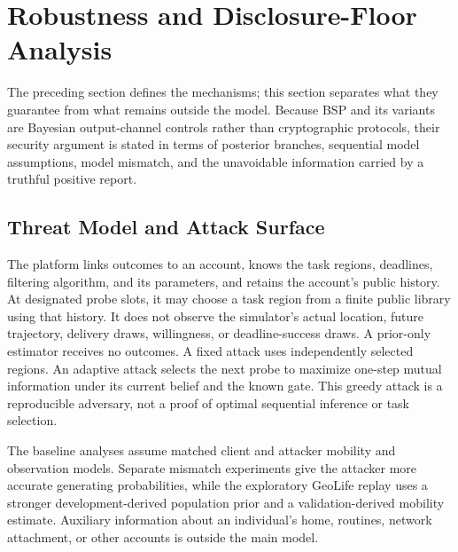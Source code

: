 \documentclass[10pt,journal,compsoc]{IEEEtran}
\begin{document}
\section{Robustness and Disclosure-Floor Analysis}
\label{sec:analysis}
The preceding section defines the mechanisms; this section separates what they guarantee from what remains outside the model. Because BSP and its variants are Bayesian output-channel controls rather than cryptographic protocols, their security argument is stated in terms of posterior branches, sequential model assumptions, model mismatch, and the unavoidable information carried by a truthful positive report.

\subsection{Threat Model and Attack Surface}
The platform links outcomes to an account, knows the task regions, deadlines, filtering algorithm, and its parameters, and retains the account's public history. At designated probe slots, it may choose a task region from a finite public library using that history. It does not observe the simulator's actual location, future trajectory, delivery draws, willingness, or deadline-success draws. A prior-only estimator receives no outcomes. A fixed attack uses independently selected regions. An adaptive attack selects the next probe to maximize one-step mutual information under its current belief and the known gate. This greedy attack is a reproducible adversary, not a proof of optimal sequential inference or task selection.

The baseline analyses assume matched client and attacker mobility and observation models. Separate mismatch experiments give the attacker more accurate generating probabilities, while the exploratory GeoLife replay uses a stronger development-derived population prior and a validation-derived mobility estimate. Auxiliary information about an individual's home, routines, network attachment, or other accounts is outside the main model.
\end{document}
